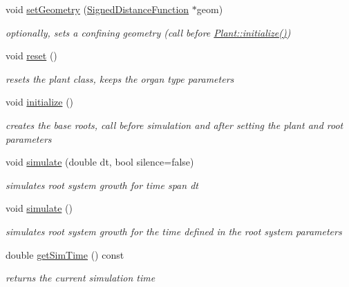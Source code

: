 \begin{DoxyCompactItemize}
void \hyperlink{classCPlantBox_1_1Plant_a6edbd4cd23318266a3cb40c29f7250ff}{set\+Geometry} (\hyperlink{classCPlantBox_1_1SignedDistanceFunction}{Signed\+Distance\+Function} $\ast$geom)
\begin{DoxyCompactList}\small\item\em optionally, sets a confining geometry (call before \hyperlink{classCPlantBox_1_1Plant_a4ef8bb05bda53551c0c32d8c72db1f0c}{Plant\+::initialize()}) \end{DoxyCompactList}\item 
void \hyperlink{classCPlantBox_1_1Plant_ab0f7bf5fcd119156eb474c8909c7ac5d}{reset} ()
\begin{DoxyCompactList}\small\item\em resets the plant class, keeps the organ type parameters \end{DoxyCompactList}\item 
void \hyperlink{classCPlantBox_1_1Plant_a4ef8bb05bda53551c0c32d8c72db1f0c}{initialize} ()
\begin{DoxyCompactList}\small\item\em creates the base roots, call before simulation and after setting the plant and root parameters \end{DoxyCompactList}\item 
void \hyperlink{classCPlantBox_1_1Plant_a47d8afff8e281a1760fa4b8046cc4378}{simulate} (double dt, bool silence=false)
\begin{DoxyCompactList}\small\item\em simulates root system growth for time span dt \end{DoxyCompactList}\item 
void \hyperlink{classCPlantBox_1_1Plant_a7761e055500ddc7f6444af0958deb1c6}{simulate} ()
\begin{DoxyCompactList}\small\item\em simulates root system growth for the time defined in the root system parameters \end{DoxyCompactList}\item 
\mbox{\label{classCPlantBox_1_1Plant_a1fe561f84e419cba3231d8f297fde490}} 
double \hyperlink{classCPlantBox_1_1Plant_a1fe561f84e419cba3231d8f297fde490}{get\+Sim\+Time} () const
\begin{DoxyCompactList}\small\item\em returns the current simulation time \end{DoxyCompactList}\item 

\end{DoxyCompactItemize}
